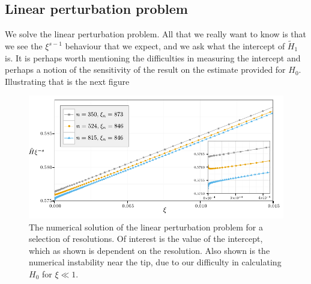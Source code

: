 \documentclass{jfm}
\begin{document}
\subsection{Linear perturbation problem}
We solve the linear perturbation problem. All that we really want to know
is that we see the $\xi^{s-1}$ behaviour that we expect, and we ask what the
intercept of $\tilde{H}_1$ is. It is perhaps worth mentioning the difficulties
in measuring the intercept and perhaps a notion of the sensitivity of the 
result on the estimate provided for $H_0$. Illustrating that is the next
figure 

\begin{figure}
 \centerline{
\includegraphics{./../../Graphs/linear-perturbation-plot-edited.pdf}}
  \caption{The numerical solution of the linear perturbation problem for a selection of
           resolutions. Of interest is the value of the intercept, which as shown is dependent
           on the resolution. Also shown is the numerical instability near the tip, due to our 
           difficulty in calculating $H_0$ for $\xi \ll 1$.}
\end{figure}
\end{document}
